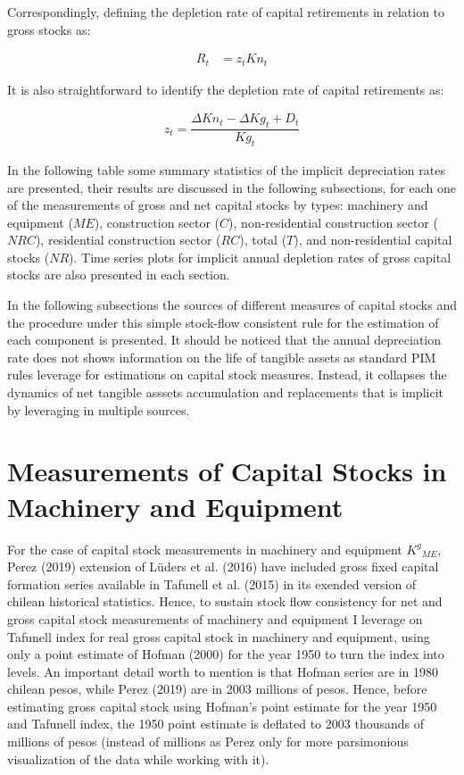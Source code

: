 

Correspondingly, defining the depletion rate of capital retirements in relation to gross stocks as: 

\begin{align}
R_{t} &= z_{t} Kn_{t}
\end{align}


It is also straightforward to identify the depletion rate of capital retirements as: 

\begin{align}
z_{t} = \dfrac{\Delta Kn_{t} - \Delta Kg_{t} + D_{t}}{Kg_{t}}
\end{align}


In the following table some summary statistics of the implicit depreciation rates are presented, their results are discussed in the following subsections, for each one of the measurements of gross and net capital stocks by types: machinery and equipment ($ME$), construction sector ($C$), non-residential construction sector ($NRC$), residential construction sector ($RC$), total ($T$), and non-residential capital stocks ($NR$). Time series plots for implicit annual depletion rates of gross capital stocks are also presented in each section. 



In the following subsections the sources of different measures of capital stocks and the procedure under this simple stock-flow consistent rule for the estimation of each component is presented. It should be noticed that the annual depreciation rate does not shows information on the life of tangible assets as standard PIM rules leverage for estimations on capital stock measures. Instead, it collapses the dynamics of net tangible asssets accumulation and replacements that is implicit by leveraging in multiple sources.  

\section{Measurements of Capital Stocks in Machinery and Equipment}

For the case of capital stock measurements in machinery and equipment ${K^{g}}_{ME}$, Perez (2019) extension of Lüders et al. (2016) have included gross fixed capital formation series available in Tafunell et al. (2015) in its exended version of chilean historical statistics. Hence, to sustain stock flow consistency for net and gross capital stock measurements of machinery and equipment I leverage on Tafunell index for real gross capital stock in machinery and equipment, using only a point estimate of Hofman (2000) for the year 1950 to turn the index into levels.  An important detail worth to mention is that Hofman series are in 1980 chilean pesos, while Perez (2019) are in 2003 millions of pesos. Hence, before estimating gross capital stock using Hofman's point estimate for the year 1950 and Tafunell index, the 1950 point estimate is deflated to 2003 thousands of millions of pesos (instead of millions as Perez only for more parsimonious visualization of the data while working with it). 
	
